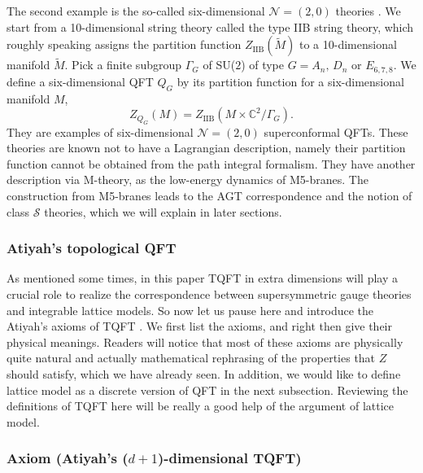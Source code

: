 The second example is the so-called six-dimensional $\mathcal{N}=\left(2,0\right)$
theories \cite{Witten:1995zh}. We start from a 10-dimensional string theory called the
type IIB string theory, which roughly speaking assigns the partition
function $Z_{\mathrm{IIB}}(\tilde{M})$ to a 10-dimensional
manifold $\tilde{M}$. Pick a finite subgroup $\Gamma_{G}$ of SU($2$)
of type $G=A_{n},\,D_{n}$ or $E_{6,7,8}$. We define a six-dimensional
QFT $Q_{G}$ by its partition function for a six-dimensional manifold
$M$, 
\begin{equation}
Z_{Q_{G}}\left(M\right)  =  Z_{\mathrm{IIB}}\left(M\times\mathbb{C}^{2}/\Gamma_{G}\right).
\end{equation}
 They are examples of six-dimensional $\mathcal{N}=\left(2,0\right)$
superconformal QFTs. These theories are known not to have a Lagrangian
description, namely their partition function cannot be obtained from
the path integral formalism. They have another description via M-theory,
as the low-energy dynamics of M5-branes. The construction from M5-branes
leads to the AGT correspondence and the notion of class $\mathcal{S}$
theories, which we will explain in later sections. 






\subsubsection{Atiyah's topological QFT}

As mentioned some times, in this paper TQFT in extra dimensions will
play a crucial role to realize the correspondence between supersymmetric
gauge theories and integrable lattice models. So now let us pause
here and introduce the Atiyah's axioms of TQFT \cite{Atiyah:1989vu}. We first list the
axioms, and right then give their physical meanings. Readers will
notice that most of these axioms are physically quite natural and
actually mathematical rephrasing of the properties that $Z$ should
satisfy, which we have already seen. In addition, we would like to
define lattice model as a discrete version of QFT in the next subsection.
Reviewing the definitions of TQFT here will be really a good help
of the argument of lattice model. 

\subsubsection*{Axiom (Atiyah's ($d+1$)-dimensional TQFT)}

